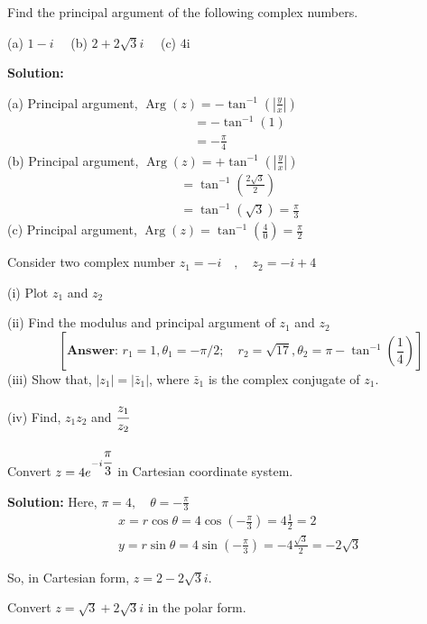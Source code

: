 \FloatBarrier
\begin{ex}
    Find the principal argument of the following complex numbers.\par 
(a) $1-i \quad $
(b) $2+2 \sqrt{3} i\quad$
(c) $4 \mathrm{i}\quad $\par 
\noindent \textbf{Solution:}\par 
\noindent (a) Principal argument, $\displaystyle \operatorname{Arg}(z)=-\tan ^{-1}\left(\left|\frac{y}{x}\right|\right)$
$$
\begin{aligned}
& =-\tan ^{-1}(1) \\
& =-\frac{\pi}{4}
\end{aligned}
$$
\noindent (b) Principal argument, $\displaystyle \operatorname{Arg}(z)=+\tan ^{-1}\left(\left|\frac{y}{x}\right|\right)$
$$
\begin{aligned}
& =\tan ^{-1}\left(\frac{2 \sqrt{3}}{2}\right) \\
& =\tan ^{-1}(\sqrt{3})=\frac{\pi}{3}
\end{aligned}
$$
\noindent (c) Principal argument, $\displaystyle \operatorname{Arg}(z)=\tan ^{-1}\left(\frac{4}{0}\right)=\frac{\pi}{2}$
\end{ex}
\begin{ex}
  Consider two complex number  $z_1=-i \quad, \quad z_2=-i+4$\par 
\noindent (i) Plot $z_1$ and $z_2$\par 
\noindent (ii) Find the modulus and principal argument of $z_1$ and $\displaystyle z_2$ $$ \quad \left[\textbf{Answer: }  r_1=1, \theta_1=-\pi / 2; \quad r_2=\sqrt{17},  \theta_2=\pi-\tan ^{-1}\left(\frac{1}{4}\right)\right]$$
\noindent (iii) Show that, $\left|z_1\right|=\left|\bar{z}_1\right|$, where $\bar{z}_1$ is the complex conjugate of $z_1$.\par 
\noindent (iv) Find, $z_1 z_2$ and $\cfrac{z_1}{z_2}$
\end{ex}
\begin{ex}
Convert $\displaystyle z=4 e^{-i \cfrac{\pi}{3}}$ in Cartesian coordinate system.\par 
\noindent \textbf{Solution:} Here, $\pi=4, \quad \theta=-\frac{\pi}{3}$
$$
\begin{aligned}
& x=r \cos \theta=4 \cos \left(-\frac{\pi}{3}\right)=4 \frac{1}{2}=2 \\
& y=r \sin \theta=4 \sin \left(-\frac{\pi}{3}\right)=-4 \frac{\sqrt{3}}{2}=-2 \sqrt{3}
\end{aligned}
$$

\noindent So, in Cartesian form, $z=2-2 \sqrt{3} i$. 
\end{ex}
\begin{ex}
    Convert $z=\sqrt{3}+2 \sqrt{3}i$  in the polar form.
\end{ex}

